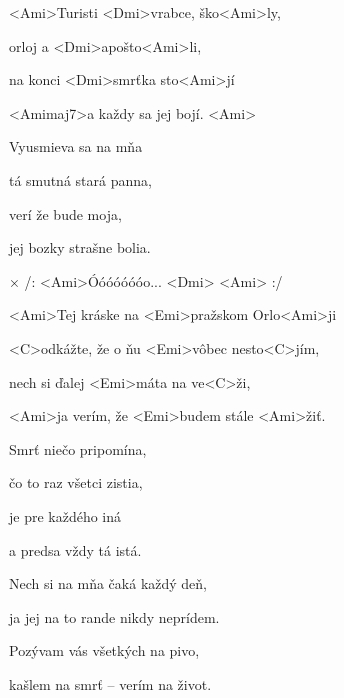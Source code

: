
\zs
<Ami>Turisti <Dmi>vrabce, ško<Ami>ly,

orloj a <Dmi>apošto<Ami>li,

na konci <Dmi>smrťka sto<Ami>jí

<Amimaj7>a každy sa jej bojí. <Ami>
\ks

\zs
Vyusmieva sa na mňa

tá smutná stará panna,

verí že bude moja,

jej bozky strašne bolia.
\ks

× /: <Ami>Óóóóóóóo... <Dmi> <Ami> :/

<Ami>Tej kráske na <Emi>pražskom Orlo<Ami>ji

<C>odkážte, že o ňu <Emi>vôbec nesto<C>jím,

nech si ďalej <Emi>máta na ve<C>ži,

<Ami>ja verím, že <Emi>budem stále <Ami>žiť.
\kr

\zs
Smrť niečo pripomína,

čo to raz všetci zistia,

je pre každého iná

a predsa vždy tá istá.
\ks

\zr \kr

\zr
Nech si na mňa čaká každý deň,

ja jej na to rande nikdy neprídem.

Pozývam vás všetkých na pivo,

kašlem na smrť -- verím na život.
\kr

\kp



